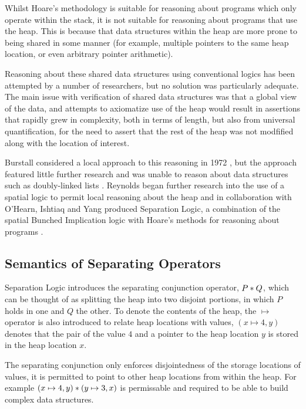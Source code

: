 \documentclass[a4paper,notitlepage]{report}
\begin{document}
  Whilst Hoare's methodology is suitable for reasoning about programs which only
  operate within the stack, it is not suitable for reasoning about programs that
  use the heap. This is because that data structures within the heap are more
  prone to being shared in some manner (for example, multiple pointers to the
  same heap location, or even arbitrary pointer arithmetic).

  Reasoning about these shared data structures using conventional logics has been attempted by a number of
  researchers, but no solution was particularly adequate. The main issue with
  verification of shared data structures was that a global view of the data, and
  attempts to axiomatize use of the heap would result in assertions
  that rapidly grew in complexity, both in terms of length, but also from
  universal quantification, for the need to assert that the rest of the heap was
  not modfified along with the location of interest.

  Burstall considered a local approach to this reasoning in 1972
  \cite{burstall1972some}, but the approach featured little further research and
  was unable to reason about data structures such as doubly-linked lists
  \cite{reynolds2000intuitionistic}. Reynolds began further research into the
  use of a spatial logic to permit local reasoning about the heap and in
  collaboration with O'Hearn, Ishtiaq and Yang produced Separation Logic, a
  combination of the spatial Bunched Implication logic with Hoare's methods for
  reasoning about programs
  \cite{Ishtiaq2001BI,OHearn2001Local,reynolds2000intuitionistic,Reynolds2002Separation}.

  \subsection{Semantics of Separating Operators}

  Separation Logic introduces the separating conjunction operator, $P \mathbin{*} Q$,
  which can be thought of as splitting the heap into two disjoint portions, in
  which $P$ holds in one and $Q$ the other. To denote the contents of the
  heap, the $\mapsto$ operator is also introduced to relate heap locations with
  values, $(x \mapsto 4, y)$ denotes that the pair of the value $4$ and a pointer
  to the heap location $y$ is stored in the heap location $x$.

  The separating conjunction only enforces disjointedness of the storage
  locations of values, it is permitted to point to other heap locations from
  within the heap. For example $(x \mapsto 4, y) \mathbin{*} (y \mapsto 3, x)$ is
  permissable and required to be able to build complex data structures.
\end{document}
